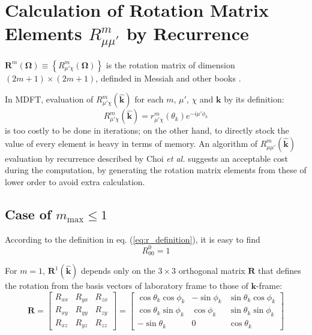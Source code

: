 
\chapter{Calculation of Rotation Matrix Elements $R_{\mu\mu'}^{m}$ by Recurrence\label{chpt:rotM-by-recurrence}}

$\mathbf{R}^{m}(\mathbf{\Omega})\equiv\left\{ R_{\mu'\chi}^{m}(\mathbf{\Omega})\right\} $
is the rotation matrix of dimension $\left(2m+1\right)\times\left(2m+1\right)$,
definded in Messiah and other books \citep{Edmonds,Gray-Gubbins,Messiah}.

In MDFT, evaluation of $R_{\mu'\chi}^{m}(\hat{\mathbf{k}})$ for each
$m$, $\mu'$, $\chi$ and $\mathbf{k}$ by its definition:
\begin{equation}
R_{\mu'\chi}^{m}(\hat{\mathbf{k}})=r_{\mu'\chi}^{m}(\theta_{k})e^{-i\mu'\phi_{k}}\label{eq:r_definition}
\end{equation}
is too costly to be done in iterations; on the other hand, to directly
stock the value of every element is heavy in terms of memory. An algorithm
of $R_{\mu\mu'}^{m}(\hat{\mathbf{k}})$ evaluation by recurrence described
by Choi \textit{et al.} \citep{Choi_1999} suggests an acceptable
cost during the computation, by generating the rotation matrix elements
from these of lower order to avoid extra calculation.

\section{Case of $m_{\mathrm{max}}\leq1$}

According to the definition in eq. (\ref{eq:r_definition}), it is
easy to find
\begin{equation}
R_{00}^{0}=1
\end{equation}

For $m=1$, $\mathbf{R}^{1}(\hat{\mathbf{k}})$ depends only on the
$3\times3$ orthogonal matrix $\mathbf{R}$ that defines the rotation
from the basis vectors of laboratory frame to those of $\mathbf{k}$-frame:
\begin{equation}
\mathbf{R}=\left[\begin{array}{ccc}
R_{xx} & R_{yx} & R_{zx}\\
R_{xy} & R_{yy} & R_{zy}\\
R_{xz} & R_{yz} & R_{zz}
\end{array}\right]=\left[\begin{array}{ccc}
\cos\theta_{k}\cos\phi_{k} & -\sin\phi_{k} & \sin\theta_{k}\cos\phi_{k}\\
\cos\theta_{k}\sin\phi_{k} & \cos\phi_{k} & \sin\theta_{k}\sin\phi_{k}\\
-\sin\theta_{k} & 0 & \cos\theta_{k}
\end{array}\right]
\end{equation}

